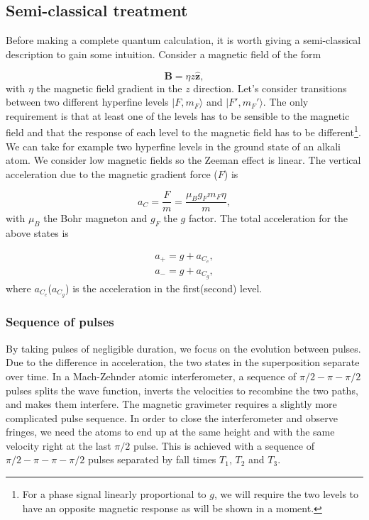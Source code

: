 \documentclass{article}
\begin{document}
\subsection{\label{semiclasical}Semi-classical treatment}

Before making a complete quantum calculation, it is worth giving a semi-classical description to gain some intuition. Consider a magnetic field of the form

\begin{equation}\label{magnetic_field0}
\textbf{B} = \eta z \hat{\textbf{z}},
\end{equation}
%
with $\eta$ the magnetic field gradient in the $z$ direction.  Let's consider transitions between two different hyperfine levels $|F,m_F \rangle$ and $|F',m_F' \rangle$. The only requirement is that at least one of the levels has to be sensible to the magnetic field and that the response of each level to the magnetic field has to be different\footnote{For a phase signal linearly proportional to $g$, we will require the two levels to have an opposite magnetic response as will be shown in a moment.}. We can take for example two hyperfine levels in the ground state of an alkali atom. We consider low magnetic fields so the Zeeman effect is linear. The vertical acceleration due to the magnetic gradient force ($F$) is

\begin{equation}\label{magnetic_force0}
a_C = \frac{F}{m} = \frac{\mu_B g_F m_F \eta}{m},
\end{equation}
%
with $\mu_B$ the Bohr magneton and $g_F$ the $g$ factor. The total acceleration for the above states is

\begin{eqnarray}\label{a1a2}
a_{+} = g + a_{C_{e}}, \nonumber \\
a_{-} = g + a_{C_{g}},
\end{eqnarray}
where $a_{C_{e}}$($a_{C_{g}}$) is the acceleration in the first(second) level. 

\subsubsection{Sequence of pulses}
By taking pulses of negligible duration, we focus on the evolution between pulses. Due to the difference in acceleration, the two states in the superposition separate over time. In a Mach-Zehnder atomic interferometer, a sequence of $\pi /2 - \pi - \pi /2$ pulses splits the wave function, inverts the velocities to recombine the two paths, and makes them interfere. The magnetic gravimeter requires a slightly more complicated pulse sequence. In order to close the interferometer and observe fringes, we need the atoms to end up at the same height and with the same velocity right at the last $\pi/2$ pulse. This is achieved with a sequence of $\pi /2 - \pi - \pi - \pi /2$ pulses separated by fall times $T_1$, $T_2$ and $T_3$. 
\end{document}
